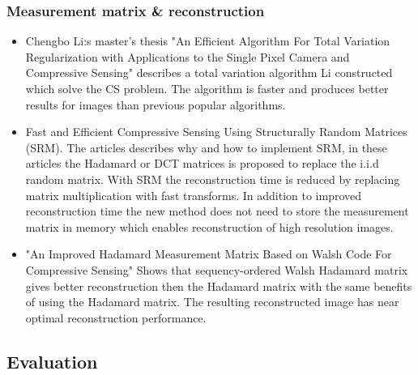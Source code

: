 \subsubsection{Measurement matrix \& reconstruction}

\begin{itemize}
    
\item \cite{article:TVAL3} Chengbo Li:s master's thesis "An Efficient Algorithm For Total Variation Regularization with Applications to the Single Pixel Camera and Compressive Sensing" describes a total variation algorithm Li constructed which solve the CS problem. The algorithm is faster and produces better results for images than previous popular algorithms.   

\item \cite{article:SRM_short, article:SRM_long, article:SRM_block} Fast and Efficient Compressive Sensing Using Structurally Random Matrices (SRM). The articles describes why and how to implement SRM, in these articles the Hadamard or DCT matrices is proposed to replace the i.i.d random matrix. With SRM the reconstruction time is reduced by replacing matrix multiplication with fast transforms. In addition to improved reconstruction time the new method does not need to store the measurement matrix in memory which enables reconstruction of high resolution images. 

\item \cite{article:an_improved_WH_matrix} "An Improved Hadamard Measurement Matrix Based on Walsh Code For Compressive Sensing" Shows that sequency-ordered Walsh Hadamard matrix gives better reconstruction then the Hadamard matrix with the same benefits of using the Hadamard matrix. The resulting reconstructed image has near optimal reconstruction performance.
	

\end{itemize}


\subsection{Evaluation}

